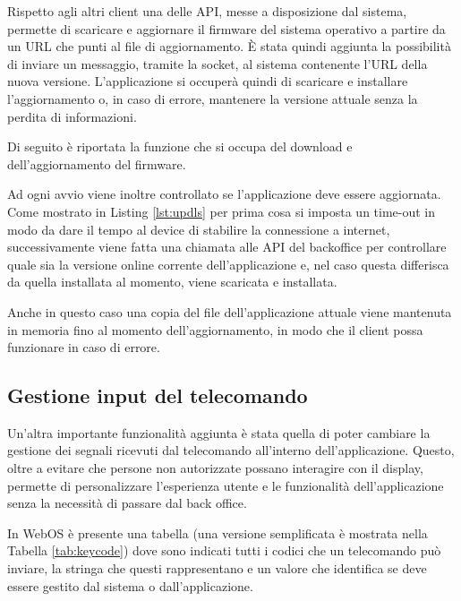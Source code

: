 Rispetto agli altri client una delle API, messe a disposizione dal sistema, permette di scaricare e aggiornare il firmware del sistema operativo a partire da un URL che punti al file di aggiornamento.
È stata quindi aggiunta la possibilità di inviare un messaggio, tramite la socket, al sistema contenente l'URL della nuova versione. L'applicazione si occuperà quindi di scaricare e installare l'aggiornamento o, in caso di errore, mantenere la versione attuale senza la perdita di informazioni.

Di seguito è riportata la funzione che si occupa del download e dell'aggiornamento del firmware.



Ad ogni avvio viene inoltre controllato se l'applicazione deve essere aggiornata.
Come mostrato in Listing \ref*{lst:updls} per prima cosa si imposta un time-out in modo da dare il tempo al device di stabilire la connessione a internet, successivamente viene fatta una chiamata alle API del backoffice per controllare quale sia la versione online corrente dell'applicazione e, nel caso questa differisca da quella installata al momento, viene scaricata e installata.



Anche in questo caso una copia del file dell'applicazione attuale viene mantenuta in memoria fino al momento dell'aggiornamento, in modo che il client possa funzionare in caso di errore.

\subsection{Gestione input del telecomando}

Un'altra importante funzionalità aggiunta è stata quella di poter cambiare la gestione dei segnali ricevuti dal telecomando all'interno dell'applicazione.
Questo, oltre a evitare che persone non autorizzate possano interagire con il display, permette di personalizzare l'esperienza utente e le funzionalità dell'applicazione senza la necessità di passare dal back office.

In WebOS è presente una tabella (una versione semplificata è mostrata nella Tabella \ref*{tab:keycode}) dove sono indicati tutti i codici che un telecomando può inviare, la stringa che questi rappresentano e un valore che identifica se deve essere gestito dal sistema o dall'applicazione.

